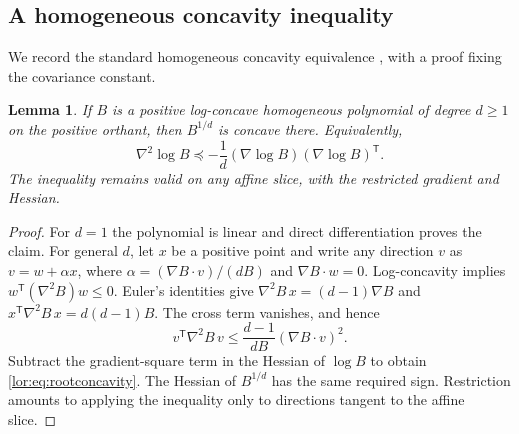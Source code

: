 \documentclass[11pt]{article}
\numberwithin{equation}{section}
\newtheorem{lemma}[theorem]{Lemma}
\theoremstyle{definition}
\begin{document}
\subsection{A homogeneous concavity inequality}
We record the standard homogeneous concavity equivalence
\cite[Proposition~2.33]{BH}, with a proof fixing the covariance constant.

\begin{lemma}\label{lor:lem:rootconcavity}
If $B$ is a positive log-concave homogeneous polynomial of degree $d\ge1$
on the positive orthant, then $B^{1/d}$ is concave there. Equivalently,
\begin{equation}
 \nabla^2\log B\preceq
           -\frac1d(\nabla\log B)(\nabla\log B)^{\mathsf T}.
 \label{lor:eq:rootconcavity}
\end{equation}
The inequality remains valid on any affine slice, with the restricted
gradient and Hessian.
\end{lemma}
\begin{proof}
For $d=1$ the polynomial is linear and direct differentiation proves the
claim. For general $d$, let $x$ be a positive point and write any direction
$v$ as $v=w+\alpha x$, where
$\alpha=(\nabla B\cdot v)/(dB)$ and $\nabla B\cdot w=0$.
Log-concavity implies $w^{\mathsf T}(\nabla^2B)w\le0$.
Euler's identities give
$\nabla^2B\,x=(d-1)\nabla B$ and
$x^{\mathsf T}\nabla^2B\,x=d(d-1)B$.
The cross term vanishes, and hence
\[
 v^{\mathsf T}\nabla^2B\,v
 \le\frac{d-1}{dB}(\nabla B\cdot v)^2.
\]
Subtract the gradient-square term in the Hessian of $\log B$ to obtain
\eqref{lor:eq:rootconcavity}. The Hessian of $B^{1/d}$ has the same required
sign. Restriction amounts to applying the inequality only to directions
tangent to the affine slice.
\end{proof}
\end{document}
